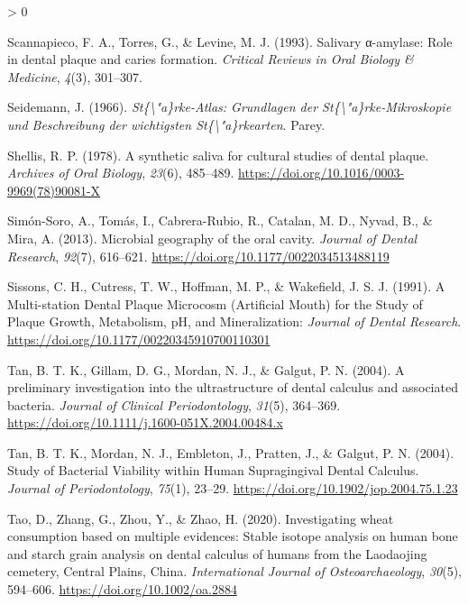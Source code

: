 \documentclass[
]{article}
\newlength{\cslhangindent}
\newenvironment{CSLReferences}[2] %
 {%
  \setlength{\parindent}{0pt}
  \ifodd #1 \everypar{\setlength{\hangindent}{\cslhangindent}}\ignorespaces\fi
  \ifnum #2 > 0
  \setlength{\parskip}{#2\baselineskip}
  \fi
 }%
 {}
\begin{document}
\begin{CSLReferences}{1}{0}
\leavevmode\hypertarget{ref-scannapiecoSalivaryAmylase1993}{}%
Scannapieco, F. A., Torres, G., \& Levine, M. J. (1993). Salivary α-amylase: Role in dental plaque and caries formation. \emph{Critical Reviews in Oral Biology \& Medicine}, \emph{4}(3), 301--307.

\leavevmode\hypertarget{ref-seidemannStarchAtlas1966}{}%
Seidemann, J. (1966). \emph{St\{\textbackslash"a\}rke-{Atlas}: {Grundlagen} der {St}\{\textbackslash"a\}rke-{Mikroskopie} und {Beschreibung} der wichtigsten {St}\{\textbackslash"a\}rkearten}. {Parey}.

\leavevmode\hypertarget{ref-shellisSyntheticSalivaCultural1978}{}%
Shellis, R. P. (1978). A synthetic saliva for cultural studies of dental plaque. \emph{Archives of Oral Biology}, \emph{23}(6), 485--489. \url{https://doi.org/10.1016/0003-9969(78)90081-X}

\leavevmode\hypertarget{ref-simon-soroOralGeography2013}{}%
Simón-Soro, A., Tomás, I., Cabrera-Rubio, R., Catalan, M. D., Nyvad, B., \& Mira, A. (2013). Microbial geography of the oral cavity. \emph{Journal of Dental Research}, \emph{92}(7), 616--621. \url{https://doi.org/10.1177/0022034513488119}

\leavevmode\hypertarget{ref-sissonsMultistationDentalPlaque1991}{}%
Sissons, C. H., Cutress, T. W., Hoffman, M. P., \& Wakefield, J. S. J. (1991). A {Multi}-station {Dental Plaque Microcosm} ({Artificial Mouth}) for the {Study} of {Plaque Growth}, {Metabolism}, {pH}, and {Mineralization}: \emph{Journal of Dental Research}. \url{https://doi.org/10.1177/00220345910700110301}

\leavevmode\hypertarget{ref-tanCalculusUltrastructure2004}{}%
Tan, B. T. K., Gillam, D. G., Mordan, N. J., \& Galgut, P. N. (2004). A preliminary investigation into the ultrastructure of dental calculus and associated bacteria. \emph{Journal of Clinical Periodontology}, \emph{31}(5), 364--369. \url{https://doi.org/10.1111/j.1600-051X.2004.00484.x}

\leavevmode\hypertarget{ref-tanBacterialViability2004}{}%
Tan, B. T. K., Mordan, N. J., Embleton, J., Pratten, J., \& Galgut, P. N. (2004). Study of {Bacterial Viability} within {Human Supragingival Dental Calculus}. \emph{Journal of Periodontology}, \emph{75}(1), 23--29. \url{https://doi.org/10.1902/jop.2004.75.1.23}

\leavevmode\hypertarget{ref-taoWheatCalculus2020}{}%
Tao, D., Zhang, G., Zhou, Y., \& Zhao, H. (2020). Investigating wheat consumption based on multiple evidences: {Stable} isotope analysis on human bone and starch grain analysis on dental calculus of humans from the {Laodaojing} cemetery, {Central Plains}, {China}. \emph{International Journal of Osteoarchaeology}, \emph{30}(5), 594--606. \url{https://doi.org/10.1002/oa.2884}


\end{CSLReferences}
\end{document}
